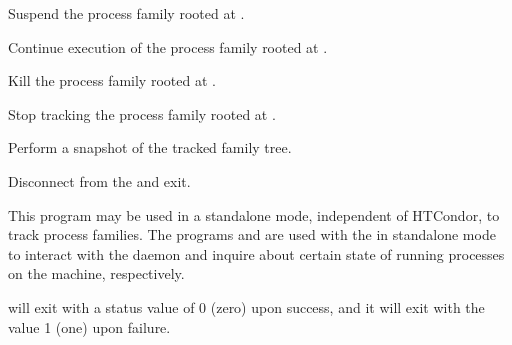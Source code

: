 \begin{ManPage}
\begin{Options}
  {Suspend the process family rooted at .}

  {Continue execution of the process family rooted at .}

  {Kill the process family rooted at .}

  {Stop tracking the process family rooted at .}

  {Perform a snapshot of the tracked family tree.}

  {Disconnect from the  and exit.}

\end{Options}
	

\GenRem

This program may be used in a standalone mode, independent of
HTCondor, to track process families. The programs  and
 are used with the  in standalone mode
to interact with the daemon and inquire about certain state of running
processes on the machine, respectively.

\ExitStatus

 will exit with a status value of 0 (zero) upon success,
and it will exit with the value 1 (one) upon failure.

\end{ManPage}
